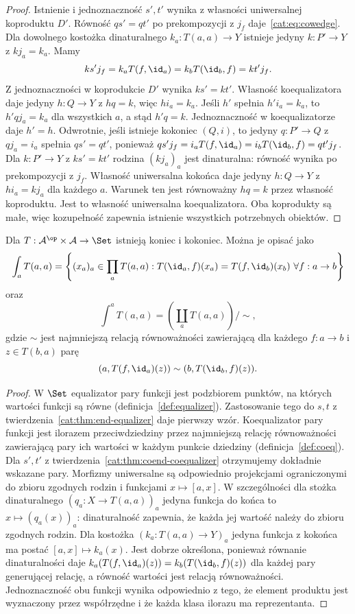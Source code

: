 \begin{proof}
Istnienie i jednoznaczność $s',t'$ wynika z własności uniwersalnej koproduktu $D'$. Równość $qs'=qt'$ po prekompozycji z $j_f$ daje~\eqref{cat:eq:cowedge}. Dla dowolnego kostożka dinaturalnego $k_a:T(a,a)\to Y$ istnieje jedyny $k:P'\to Y$ z $kj_a=k_a$. Mamy
\[
 ks'j_f=k_aT(f,\id_a)=k_bT(\id_b,f)=kt'j_f .
\]
Z jednoznaczności w koprodukcie $D'$ wynika $ks'=kt'$. Własność koequalizatora daje jedyny $h:Q\to Y$ z $hq=k$, więc $hi_a=k_a$. Jeśli $h'$ spełnia $h'i_a=k_a$, to $h'qj_a=k_a$ dla wszystkich $a$, a stąd $h'q=k$. Jednoznaczność w koequalizatorze daje $h'=h$. Odwrotnie, jeśli istnieje kokoniec $(Q,i)$, to jedyny $q:P'\to Q$ z $qj_a=i_a$ spełnia $qs'=qt'$, ponieważ $qs'j_f=i_aT(f,\id_a)=i_bT(\id_b,f)=qt'j_f$. Dla $k:P'\to Y$ z $ks'=kt'$ rodzina $(kj_a)_a$ jest dinaturalna: równość wynika po prekompozycji z $j_f$. Własność uniwersalna kokońca daje jedyny $h:Q\to Y$ z $hi_a=kj_a$ dla każdego $a$. Warunek ten jest równoważny $hq=k$ przez własność koproduktu. Jest to własność uniwersalna koequalizatora. Oba koprodukty są małe, więc kozupełność zapewnia istnienie wszystkich potrzebnych obiektów.
\end{proof}
\begin{wniosek}\label{cat:cor:end-coend-set}
Dla $T:\mathcal A^{\op}\times\mathcal A\to\Set$ istnieją koniec i kokoniec. Można je opisać jako
\[
 \int_a T(a,a)=\left\{(x_a)_a\in\prod_a T(a,a):
 T(\id_a,f)(x_a)=T(f,\id_b)(x_b)\ \forall f:a\to b\right\}
\]
oraz
\[
 \int^a T(a,a)=\left(\coprod_a T(a,a)\right)/{\sim},
\]
gdzie $\sim$ jest najmniejszą relacją równoważności zawierającą dla każdego $f:a\to b$ i $z\in T(b,a)$ parę
\[
 (a,T(f,\id_a)(z))\sim(b,T(\id_b,f)(z)).
\]
\end{wniosek}
\begin{proof}
W $\Set$ equalizator pary funkcji jest podzbiorem punktów, na których wartości funkcji są równe (definicja~\ref{def:equalizer}). Zastosowanie tego do $s,t$ z twierdzenia~\ref{cat:thm:end-equalizer} daje pierwszy wzór. Koequalizator pary funkcji jest ilorazem przeciwdziedziny przez najmniejszą relację równoważności zawierającą pary ich wartości w każdym punkcie dziedziny (definicja~\ref{def:coeq}). Dla $s',t'$ z twierdzenia~\ref{cat:thm:coend-coequalizer} otrzymujemy dokładnie wskazane pary. Morfizmy uniwersalne są odpowiednio projekcjami ograniczonymi do zbioru zgodnych rodzin i funkcjami $x\mapsto[a,x]$. W szczególności dla stożka dinaturalnego $(q_a:X\to T(a,a))_a$ jedyna funkcja do końca to $x\mapsto(q_a(x))_a$: dinaturalność zapewnia, że każda jej wartość należy do zbioru zgodnych rodzin. Dla kostożka $(k_a:T(a,a)\to Y)_a$ jedyna funkcja z kokońca ma postać $[a,x]\mapsto k_a(x)$. Jest dobrze określona, ponieważ równanie dinaturalności daje $k_a(T(f,\id_a)(z))=k_b(T(\id_b,f)(z))$ dla każdej pary generującej relację, a równość wartości jest relacją równoważności. Jednoznaczność obu funkcji wynika odpowiednio z tego, że element produktu jest wyznaczony przez współrzędne i że każda klasa ilorazu ma reprezentanta.
\end{proof}
